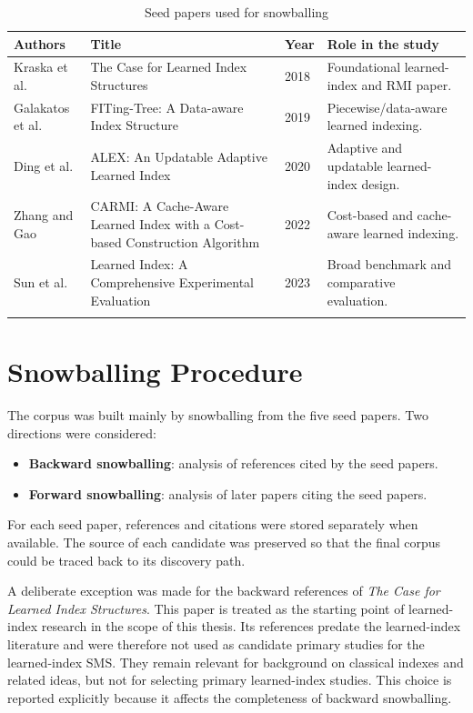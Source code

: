 \documentclass[a4paper, 12pt, twoside]{report}
\begin{document}
\begin{longtable}{|p{2.7cm}|p{5.6cm}|p{1.1cm}|p{3.2cm}|}
\hline
\textbf{Authors} & \textbf{Title} & \textbf{Year} & \textbf{Role in the study} \\
\hline
Kraska et al. & The Case for Learned Index Structures & 2018 & Foundational learned-index and RMI paper. \\
\hline
Galakatos et al. & FITing-Tree: A Data-aware Index Structure & 2019 & Piecewise/data-aware learned indexing. \\
\hline
Ding et al. & ALEX: An Updatable Adaptive Learned Index & 2020 & Adaptive and updatable learned-index design. \\
\hline
Zhang and Gao & CARMI: A Cache-Aware Learned Index with a Cost-based Construction Algorithm & 2022 & Cost-based and cache-aware learned indexing. \\
\hline
Sun et al. & Learned Index: A Comprehensive Experimental Evaluation & 2023 & Broad benchmark and comparative evaluation. \\
\hline
\caption{Seed papers used for snowballing}
\label{tab:seed-papers}
\end{longtable}

\section{Snowballing Procedure}

The corpus was built mainly by snowballing from the five seed papers. Two directions were considered:

\begin{itemize}
\item \textbf{Backward snowballing}: analysis of references cited by the seed papers.
\item \textbf{Forward snowballing}: analysis of later papers citing the seed papers.
\end{itemize}

For each seed paper, references and citations were stored separately when available. The source of each candidate was preserved so that the final corpus could be traced back to its discovery path.

A deliberate exception was made for the backward references of \textit{The Case for Learned Index Structures}. This paper is treated as the starting point of learned-index research in the scope of this thesis. Its references predate the learned-index literature and were therefore not used as candidate primary studies for the learned-index SMS. They remain relevant for background on classical indexes and related ideas, but not for selecting primary learned-index studies. This choice is reported explicitly because it affects the completeness of backward snowballing.
\end{document}
